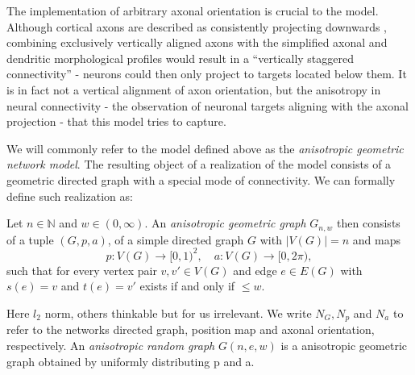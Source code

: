 The implementation of arbitrary axonal orientation is crucial to the
model. Although cortical axons are described as consistently
projecting downwards \parencite[%
cf. Section~\ref{sec:biol_anisotropy}]{Braitenberg_Cortex}, combining
exclusively vertically aligned axons with the simplified axonal and
dendritic morphological profiles would result in a \enquote{vertically
  staggered connectivity} - neurons could then only project to targets
located below them.  It is in fact not a vertical alignment of axon
orientation, but the anisotropy in neural connectivity - the
observation of neuronal targets aligning with the axonal projection -
that this model tries to capture. 



We will commonly refer to the model defined above as the
\textit{anisotropic geometric network model}. The resulting object of
a realization of the model consists of a geometric directed graph
with a special mode of connectivity. We can formally define such
realization as:

\begin{definition}
\label{def:anisotropic_geometric_graph} 
Let $n \in \mathbb{N}$ and $w \in (0,\infty)$. An
\textit{anisotropic geometric graph} $G_{n,w}$ then consists of a
tuple $(G,p,a)$, of a simple directed graph $G$ with $|V(G)|=n$ and
maps \[p:V(G)\to[0,1)^2, \quad a:V(G)\to[0,2\pi),\] such that for every
vertex pair $v,v' \in V(G)$ and edge $e\in E(G)$ with $s(e)=v$ and
$t(e)=v'$ exists if and only if $\le w$. %
\end{definition}

\begin{remark} 
Here $l_2$ norm, others thinkable but for us irrelevant.
We write $N_G, N_p$ and $N_a$ to refer to the networks directed graph,
position map and axonal orientation, respectively. 
An \textit{anisotropic random graph} $G(n,e,w)$ is a anisotropic
geometric graph obtained by uniformly distributing p and a. %
\end{remark}




